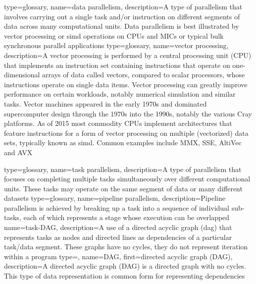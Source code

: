 {
  type=glossary,
  name={data parallelism},
  description={A type of parallelism that involves carrying out a single task
    and/or instruction on different segments of data across many computational
      units. Data parallelism is best illustrated by \gls{vector processing} or \gls{simd} operations on
      \glspl{CPU} and \glspl{MIC} or typical \gls{bulk synchronous} parallel applications}
}
{
  type=glossary,
  name={vector processing},
  description={A vector processing is performed by a central
  processing unit (\gls{CPU}) that implements an instruction set containing
  instructions that operate on one-dimensional arrays of data called
  vectors, compared to scalar processors, whose instructions operate
  on single data items. Vector processing can greatly improve
  performance on certain workloads, notably numerical simulation and
  similar tasks. Vector machines appeared in the early 1970s and
  dominated supercomputer design through the 1970s into the 1990s,
  notably the various Cray platforms. As of 2015 most commodity \glspl{CPU}
  implement architectures that feature instructions for a form of
  vector processing on multiple (vectorized) data sets, typically
  known as \gls{simd}. Common examples include MMX, \gls{SSE},
  AltiVec and \gls{AVX}}
}


{
  type=glossary,
  name={task parallelism},
  description={A type of parallelism that focuses on completing multiple tasks simultaneously over different computational units. These tasks may operate on the same segment of data or many different datasets}
}
{
  type=glossary,
  name={pipeline parallelism},
  description={Pipeline parallelism is achieved by breaking up a task into a sequence of
individual sub-tasks, each of which represents a stage whose execution can be
  overlapped}
}
{
  name={task-DAG},
  description={A use of a directed acyclic graph (\gls{dag}) that represents tasks as nodes and directed lines as dependencies of a particular task/data segment. These graphs have no cycles, they do not represent iteration within a program}
}
{
  type=\acronymtype,
  name={DAG},
  first={directed acyclic graph (DAG)},
  description={A directed acyclic graph (DAG) is a directed graph with no cycles. This type of data representation is common form for representing dependencies}
}

